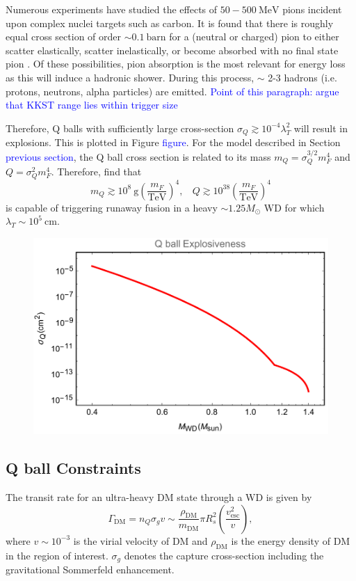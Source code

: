 \documentclass[11 pt,preprint,preprintnumbers,amsmath,amssymb, prd]{revtex4}
\def\r{\right)}
\def\l{\left(}
\begin{document}
Numerous experiments have studied the effects of $50 - 500 ~\text{MeV}$ pions incident upon complex nuclei targets such as carbon. It is found that there is roughly equal cross section of order $\sim 0.1 ~\text{barn}$ for a (neutral or charged) pion to either scatter elastically, scatter inelastically, or become absorbed with no final state pion \cite{Pionnuclear}. Of these possibilities, pion absorption is the most relevant for energy loss as this will induce a hadronic shower. During this process, $\sim$ 2-3 hadrons (i.e. protons, neutrons, alpha particles) are emitted. \textcolor{blue}{Point of this paragraph: argue that KKST range lies within trigger size}

Therefore, Q balls with sufficiently large cross-section $\sigma_Q \gtrsim 10^{-4} \lambda_T^2$ will result in explosions. This is plotted in Figure \textcolor{blue}{figure}. For the model described in Section \textcolor{blue}{previous section}, the Q ball cross section is related to its mass $m_Q = \sigma_Q^{3/2} m_F^4$ and $Q = \sigma_Q^2 m_F^4$. Therefore, find that
\begin{equation}
m_Q \gtrsim 10^8 ~\text{g} \l\frac{m_F}{\text{TeV}}\r^4, ~~~~ Q \gtrsim 10^{38} \l\frac{m_F}{\text{TeV}}\r^4
\end{equation}
is capable of triggering runaway fusion in a heavy $\sim 1.25 M_{\odot}$ WD for which $\lambda_T \sim 10^5 ~\text{cm}$.

\begin{figure}
\includegraphics[scale=.45]{boomQball.pdf}
\end{figure}


\subsection{Q ball Constraints}
The transit rate for an ultra-heavy DM state through a WD is given by
\begin{equation}
\Gamma_\text{DM} = n_Q \sigma_g v \sim \frac{\rho_{\text{DM}}}{m_\text{DM}} \pi R_{s}^2 \l\frac{v_\text{esc}^2}{v}\r,
\end{equation}
where $v \sim 10^{-3}$ is the virial velocity of DM and $\rho_{\text{DM}}$ is the energy density of DM in the region of interest. $\sigma_g$ denotes the capture cross-section including the gravitational Sommerfeld enhancement.
\end{document}
